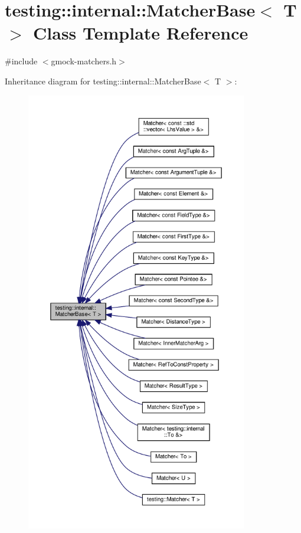 \hypertarget{classtesting_1_1internal_1_1_matcher_base}{}\section{testing\+:\+:internal\+:\+:Matcher\+Base$<$ T $>$ Class Template Reference}
\label{classtesting_1_1internal_1_1_matcher_base}


{\ttfamily \#include $<$gmock-\/matchers.\+h$>$}



Inheritance diagram for testing\+:\+:internal\+:\+:Matcher\+Base$<$ T $>$\+:
\nopagebreak
\begin{figure}[H]
\begin{center}
\leavevmode
\includegraphics[height=550pt]{classtesting_1_1internal_1_1_matcher_base__inherit__graph}
\end{center}
\end{figure}
